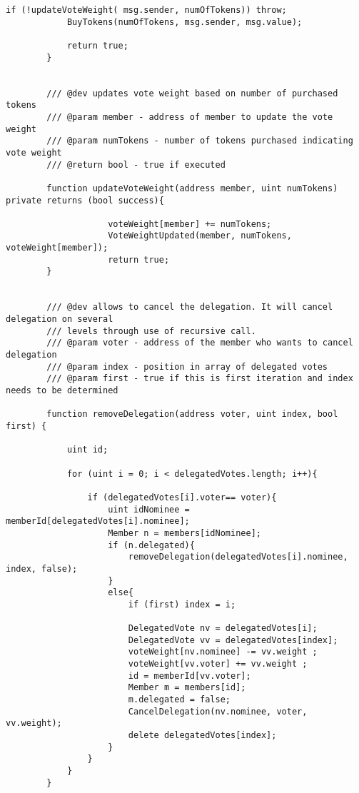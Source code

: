 \documentclass{article}
\begin{document}
\begin{lstlisting}[style=MyCStyle]
            if (!updateVoteWeight( msg.sender, numOfTokens)) throw;
            BuyTokens(numOfTokens, msg.sender, msg.value);

            return true;
        }


        /// @dev updates vote weight based on number of purchased tokens
        /// @param member - address of member to update the vote weight
        /// @param numTokens - number of tokens purchased indicating vote weight
        /// @return bool - true if executed

        function updateVoteWeight(address member, uint numTokens) private returns (bool success){

                    voteWeight[member] += numTokens;
                    VoteWeightUpdated(member, numTokens, voteWeight[member]);
                    return true;
        }


        /// @dev allows to cancel the delegation. It will cancel delegation on several
        /// levels through use of recursive call.
        /// @param voter - address of the member who wants to cancel delegation
        /// @param index - position in array of delegated votes
        /// @param first - true if this is first iteration and index needs to be determined

        function removeDelegation(address voter, uint index, bool first) {

            uint id;

            for (uint i = 0; i < delegatedVotes.length; i++){

                if (delegatedVotes[i].voter== voter){
                    uint idNominee =  memberId[delegatedVotes[i].nominee];
                    Member n = members[idNominee];
                    if (n.delegated){
                        removeDelegation(delegatedVotes[i].nominee, index, false);
                    }
                    else{
                        if (first) index = i;

                        DelegatedVote nv = delegatedVotes[i];
                        DelegatedVote vv = delegatedVotes[index];
                        voteWeight[nv.nominee] -= vv.weight ;
                        voteWeight[vv.voter] += vv.weight ;
                        id = memberId[vv.voter];
                        Member m = members[id];
                        m.delegated = false;
                        CancelDelegation(nv.nominee, voter, vv.weight);
                        delete delegatedVotes[index];
                    }
                }
            }
        }



\end{lstlisting}
\end{document}

